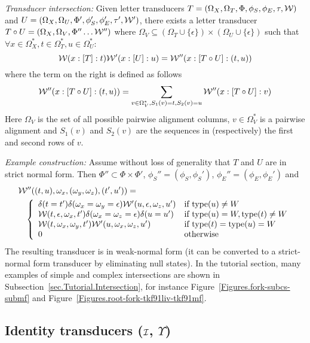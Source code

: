 \documentclass{article}
\newcommand{\secref}[1]{Subsection~\ref{sec.#1}}
\newcommand{\seclabel}[1]{\label{sec.#1}}
\newcommand{\figref}[1]{Figure~\ref{Figures.#1}}
\newcommand\gappedalphabet[1]{(\Omega_{#1} \cup \{\epsilon\})}
\newcommand\gappedpair[2]{\gappedalphabet{#1} \times \gappedalphabet{#2}}
\newcommand\wtrans[4]{#1(#2 : [#3] : #4)}
\newcommand\identity{{\cal I}}
\newcommand\fork{\circ}
\newcommand\idfork{\Upsilon}
\newcommand\States{\Phi}
\newcommand\Transitions{\tau}
\newcommand\startstate{\phi_S}
\newcommand\laststate{\phi_E}
\newcommand\weight{{\cal W}}
\newcommand\statetype{\mbox{type}}
\begin{document}
{\em Transducer intersection:}
Given letter transducers
 $T = (\Omega_X, \Omega_T, \States, \startstate, \laststate, \Transitions, \weight)$ and
 $U = (\Omega_X, \Omega_U, \States', \startstate', \laststate', \Transitions', \weight')$,
there exists a letter transducer $T\fork U = (\Omega_X, \Omega_V, \States'' \ldots \weight'')$
where $\Omega_V \subseteq \gappedpair{T}{U}$
such that $\forall x \in \Omega_X^\ast, t \in \Omega_T^\ast, u \in \Omega_U^\ast$:
\[
\wtrans{\weight}{x}{T}{t} \wtrans{\weight'}{x}{U}{u} = \wtrans{\weight''}{x}{T\fork U}{(t,u)}
\]
where the term on the right is defined as follows
\[
\wtrans{\weight''}{x}{T\fork U}{(t,u)} = \sum_{v \in \Omega_V^\ast, S_1(v)=t, S_2(v)=u } \wtrans{\weight''}{x}{T\fork U}{v}
\]
Here $\Omega_V$ is the set of all possible pairwise alignment columns,
$v \in \Omega_V^\ast$ is a pairwise alignment and
$S_1(v)$ and $S_2(v)$ are the sequences in (respectively) the first and second rows of $v$.

{\em Example construction:}
Assume without loss of generality that $T$ and $U$ are in strict normal form.
Then $\States'' \subset \States \times \States'$,
$\startstate''=(\startstate,\startstate')$, $\laststate''=(\laststate,\laststate')$
and
\begin{eqnarray*}
\lefteqn{\weight''((t,u),\omega_x,(\omega_y,\omega_z),(t',u')) =} & & \\
 & & \left\{ \begin{array}{ll}
\delta(t=t') \delta(\omega_x=\omega_y=\epsilon) \weight'(u,\epsilon,\omega_z,u') & \mbox{if $\statetype(u) \neq W$} \\
\weight(t,\epsilon,\omega_x,t') \delta(\omega_x=\omega_z=\epsilon) \delta(u=u') & \mbox{if $\statetype(u) = W,\statetype(t) \neq W$} \\
\weight(t,\omega_x,\omega_y,t') \weight'(u,\omega_x,\omega_z,u') & \mbox{if $\statetype(t) = \statetype(u) = W$} \\
0 & \mbox{otherwise}
\end{array} \right.
\end{eqnarray*}
The resulting transducer is in weak-normal form (it can be converted to a strict-normal form transducer by eliminating null states).
In the tutorial section, many examples of simple and complex intersections are shown in \secref{Tutorial.Intersection}, for instance \figref{fork-subcs-submf} and  \figref{root-fork-tkf91liv-tkf91mf}. 



\subsection{Identity transducers ($\identity$, $\idfork$)}
\seclabel{Identity}
\end{document}
